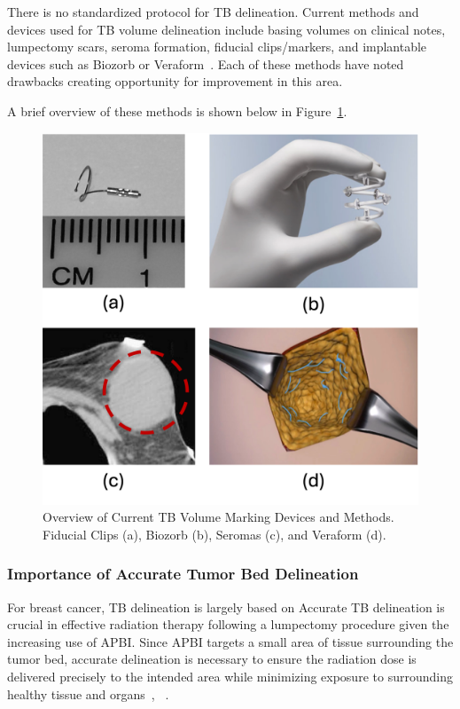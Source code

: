 There is no standardized protocol for TB delineation. Current methods and devices used for TB volume delineation include basing volumes on clinical notes, lumpectomy scars, seroma formation, fiducial clips/markers, and implantable devices such as Biozorb or Veraform~\cite{RefWorks:RefID:25-acree2022review}. Each of these methods have noted drawbacks creating opportunity for improvement in this area.

A brief overview of these methods is shown below in Figure~\ref{fig:introduction:current_devices_overview}.

\begin{figure}[h!]
        \centering
        \includegraphics[width=0.6\linewidth]{../figs/introduction/current_devices_overview.png}
        \caption{Overview of Current TB Volume Marking Devices and Methods. Fiducial Clips (a), Biozorb (b), Seromas (c), and Veraform (d).}
        \label{fig:introduction:current_devices_overview}
\end{figure}

\subsubsection{Importance of Accurate Tumor Bed Delineation\label{sec:introduction:motivation:importanceofaccuratetumorbeddelineation}}

For breast cancer, TB delineation is largely based on Accurate TB delineation is crucial in effective radiation therapy following a lumpectomy procedure given the increasing use of APBI. Since APBI targets a small area of tissue surrounding the tumor bed, accurate delineation is necessary to ensure the radiation dose is delivered precisely to the intended area while minimizing exposure to surrounding healthy tissue and organs~\cite{RefWorks:RefID:197-den2015postlumpectomy}, ~\cite{RefWorks:RefID:25-acree2022review}.

